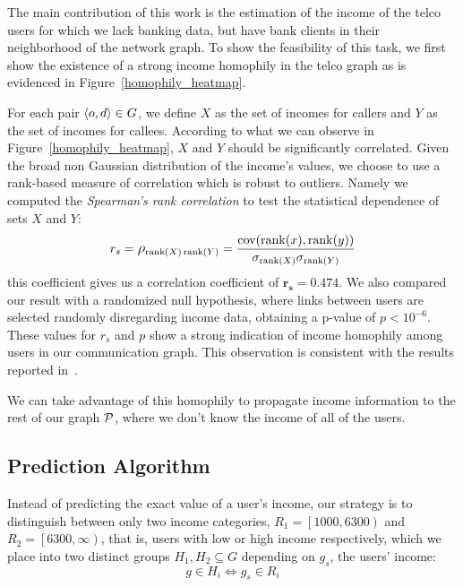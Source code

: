 The main contribution of this work is the estimation of the income of the telco users for which we lack banking data, but have bank clients in their neighborhood of the network graph. To show the feasibility of this task, we first show the existence of a strong income homophily in the telco graph as is evidenced in Figure~\ref{homophily_heatmap}.


For each pair \( \left< o, d \right> \in \mathlarger{G} \), we define \( X \) as the set of incomes for callers and \( Y \) as the set of incomes for callees. According to what we can observe in Figure~\ref{homophily_heatmap}, \( X \) and \( Y \) should be significantly correlated. Given the broad non Gaussian distribution of the income's values, we choose to use a rank-based measure of correlation which is robust to outliers.
Namely we computed the \textit{Spearman's rank correlation} %
to test the statistical dependence of sets \( X \) and \( Y \):
\begin{equation}
r_s = \mathlarger{\rho}_{\operatorname{rank}(X) \operatorname{rank}(Y)} = \frac{\operatorname{cov}(\operatorname{rank}(x), \operatorname{rank}(y))}{\sigma_{\operatorname{rank}(X)} \sigma_{\operatorname{rank}(Y)}}
\label{spearman}
\end{equation}
this coefficient gives us a correlation coefficient of $\mathbf{r_s = 0.474}$. We also compared our result with a randomized null hypothesis, where links between users are selected randomly disregarding income data, obtaining a p-value of $ p < 10^{-6} $. These values for $r_s$ and $p$ show a strong indication of income homophily among users in our communication graph.
This observation is consistent with the results reported in~\cite{leo2015socioeconomic}.

We can take advantage of this homophily to propagate income information to the rest of our graph $ \mathcal{P} $, where we don't know the income of all of the users.


\subsection{Prediction Algorithm}

Instead of predicting the exact value of a user's income, our strategy is to distinguish between only two income categories, $R_1 = \left[1000, 6300\right)$ and $R_2 = \left[6300, \infty\right)$, that is, users with low or high income respectively, which we place into two distinct groups $ H_1, H_2 \subseteq G$ depending on \( g_s \), the users' income:
\[
	g \in H_i \iff g_s \in R_i
\]

